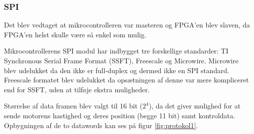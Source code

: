 \subsubsection{SPI}
\label{sec:spi-implementering}
Det blev vedtaget at mikrocontrolleren var masteren og FPGA'en blev slaven, da FPGA'en helst skulle være så enkel som mulig.

Mikrocontrollerens SPI modul har indbygget tre forskellige standarder: TI Synchronous Serial Frame Format (SSFT), Freescale og Microwire. 
Microwire blev udelukket da den ikke er full-duplex og dermed ikke en SPI standard. 
Freescale formatet blev udelukket da opsætningen af denne var mere kompliceret end for SSFT, uden at tilføje ekstra muligheder.



Størrelse af data framen blev valgt til 16 bit ($2^4$), da det giver mulighed for at sende motorens hastighed og deres position (begge 11 bit) samt kontroldata. Opbygningen af de to datawords kan ses på figur \ref{fig:protokol1}.


